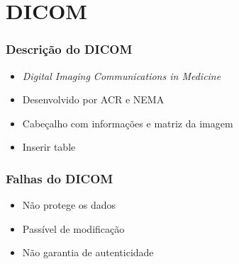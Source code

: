 \documentclass{beamer}
\begin{document}
\section{DICOM}
\begin{frame}
\frametitle{Descrição do DICOM}

\begin{itemize}
\item \textit{Digital Imaging Communications in Medicine}\newline
\item Desenvolvido por ACR e NEMA\newline
\item Cabeçalho com informações e matriz da imagem\newline
\item Inserir table
\end{itemize}

\end{frame}


\begin{frame}
\frametitle{Falhas do DICOM}

\begin{itemize}
\item Não protege os dados\newline
\item Passível de modificação\newline
\item Não garantia de autenticidade
\end{itemize}

\end{frame}

\end{document}
